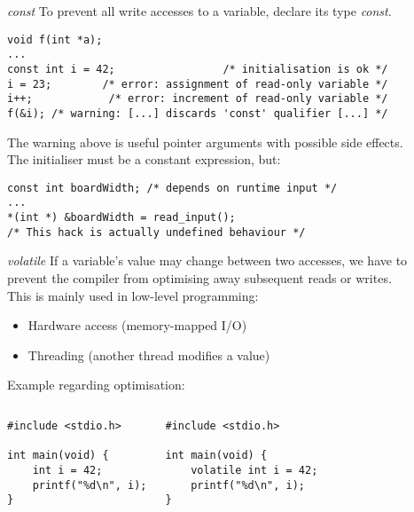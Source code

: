 \begin{frame}[fragile = singleslide]{\textit{const}}
To prevent all write accesses to a variable, declare its type \textit{const}.\\
\begin{lstlisting}
void f(int *a);
...
const int i = 42;				  /* initialisation is ok */
i = 23; 	   /* error: assignment of read-only variable */
i++;			/* error: increment of read-only variable */
f(&i); /* warning: [...] discards 'const' qualifier [...] */
\end{lstlisting}
The warning above is useful pointer arguments with possible side effects.\\
\bigskip
The initialiser must be a constant expression, but:
\begin{lstlisting}
const int boardWidth; /* depends on runtime input */
...
*(int *) &boardWidth = read_input();
/* This hack is actually undefined behaviour */
\end{lstlisting}
\end{frame}

\begin{frame}[fragile = singleslide]{\textit{volatile}}
If a variable's value may change between two accesses, we have to\\
prevent the compiler from optimising away subsequent reads or writes.\\
\bigskip
This is mainly used in low-level programming:
\begin{itemize}
	\item Hardware access (memory-mapped I/O)
	\item Threading (another thread modifies a value)
\end{itemize}
\bigskip
Example regarding optimisation:
\begin{columns}
	\begin{lstlisting}
#include <stdio.h>

int main(void) {
    int i = 42;
    printf("%d\n", i);
}
\end{lstlisting}
	\begin{lstlisting}
#include <stdio.h>

int main(void) {
    volatile int i = 42;
    printf("%d\n", i);
}
\end{lstlisting}
\end{columns}
\end{frame}

